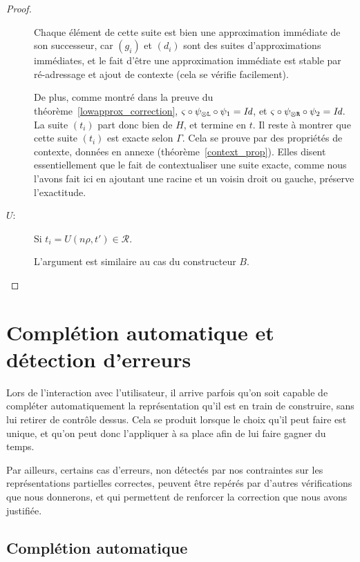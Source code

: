 \documentclass[11pt,a4paper]{article}
\theoremstyle{plain}
\theoremstyle{definition}
\theoremstyle{remark}
\newcommand*{\tensor}{\otimes}
\newcommand*{\someperm}{\varsigma}
\newcommand*{\sequent}{\Gamma}
\newcommand*{\Left}{\textnormal{\texttt{L}}}
\newcommand*{\Right}{\textnormal{\texttt{R}}}
\newcommand*{\representations}{\ensuremath{\mathcal{R}}}
\begin{document}
\begin{proof}
\begin{description}
            Chaque élément de cette suite est bien une approximation immédiate de son successeur, car $(g_i)$ et $(d_i)$ sont des suites d'approximations immédiates, et le fait d'être une approximation immédiate est stable par ré-adressage et ajout de contexte (cela se vérifie facilement).
    
            De plus, comme montré dans la preuve du théorème~\ref{lowapprox_correction}, $\someperm \circ \psi_{\tensor\Left} \circ \psi_1 = \textit{Id}$, et $\someperm \circ \psi_{\tensor\Right} \circ \psi_2 = \textit{Id}$. La suite $(t_i)$ part donc bien de $H$, et termine en $t$.
            Il reste à montrer que cette suite $(t_i)$ est exacte selon $\sequent$.
            Cela se prouve par des propriétés de contexte, données en annexe (théorème~\ref{context_prop}). Elles disent essentiellement que le fait de contextualiser une suite exacte, comme nous l'avons fait ici en ajoutant une racine et un voisin droit ou gauche, préserve l'exactitude. 

        \item[$U$:]
            Si $t_i = U(n\rho, t') \in \representations$.
            
            L'argument est similaire au cas du constructeur $B$.
\qedhere
    \end{description}
\end{proof}

\section{Complétion automatique et détection d'erreurs}

Lors de l'interaction avec l'utilisateur, il arrive parfois qu'on soit capable de compléter automatiquement la représentation qu'il est en train de construire, sans lui retirer de contrôle dessus. Cela se produit lorsque le choix qu'il peut faire est unique, et qu'on peut donc l'appliquer à sa place afin de lui faire gagner du temps.

Par ailleurs, certains cas d'erreurs, non détectés par nos contraintes sur les représentations partielles correctes, peuvent être repérés par d'autres vérifications que nous donnerons, et qui permettent de renforcer la correction que nous avons justifiée.

\subsection{Complétion automatique}
\end{document}
